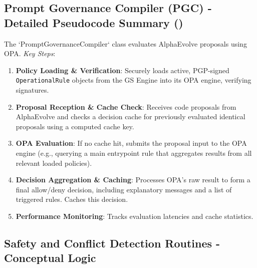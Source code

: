 \documentclass[sigconf,natbib]{acmart}
\begin{document}
\subsection[Prompt Governance Compiler (PGC) - Detailed Pseudocode Summary]{Prompt Governance Compiler (PGC) - Detailed Pseudocode Summary ()}
\label{app:pgc_pseudocode}
The `PromptGovernanceCompiler` class evaluates AlphaEvolve proposals using OPA.
\textit{Key Steps}:
\begin{enumerate}
    \item \textbf{Policy Loading \& Verification}: Securely loads active, PGP-signed \texttt{OperationalRule} objects from the GS Engine into its OPA engine, verifying signatures.
    \item \textbf{Proposal Reception \& Cache Check}: Receives code proposals from AlphaEvolve and checks a decision cache for previously evaluated identical proposals using a computed cache key.
    \item \textbf{OPA Evaluation}: If no cache hit, submits the proposal input to the OPA engine (e.g., querying a main entrypoint rule that aggregates results from all relevant loaded policies).
    \item \textbf{Decision Aggregation \& Caching}: Processes OPA's raw result to form a final allow/deny decision, including explanatory messages and a list of triggered rules. Caches this decision.
    \item \textbf{Performance Monitoring}: Tracks evaluation latencies and cache statistics.
\end{enumerate}

\subsection{Safety and Conflict Detection Routines - Conceptual Logic}
\label{app:safety_conflict_detection}
\end{document}
